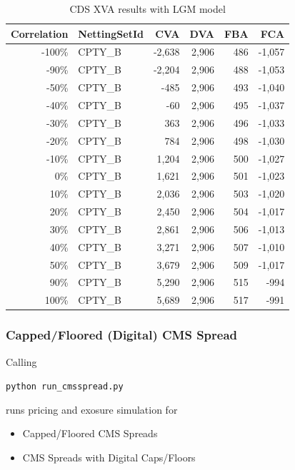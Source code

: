 \begin{table}[hbt]
\scriptsize
\begin{center}
\begin{tabular}{|r|l|r|r|r|r|}
\hline
Correlation & NettingSetId & CVA & DVA & FBA & FCA \\
\hline
-100\%  &  CPTY\_B  &  -2,638  &  2,906  &  486  &  -1,057 \\
 -90\%  &  CPTY\_B  &  -2,204  &  2,906  &  488  &  -1,053 \\
 -50\%  &  CPTY\_B  &    -485  &  2,906  &  493  &  -1,040 \\
 -40\%  &  CPTY\_B  &     -60  &  2,906  &  495  &  -1,037 \\
 -30\%  &  CPTY\_B  &     363  &  2,906  &  496  &  -1,033 \\
 -20\%  &  CPTY\_B  &     784  &  2,906  &  498  &  -1,030 \\
 -10\%  &  CPTY\_B  &   1,204  &  2,906  &  500  &  -1,027 \\
   0\%  &  CPTY\_B  &   1,621  &  2,906  &  501  &  -1,023 \\
  10\%  &  CPTY\_B  &   2,036  &  2,906  &  503  &  -1,020 \\
  20\%  &  CPTY\_B  &   2,450  &  2,906  &  504  &  -1,017 \\
  30\%  &  CPTY\_B  &   2,861  &  2,906  &  506  &  -1,013 \\
  40\%  &  CPTY\_B  &   3,271  &  2,906  &  507  &  -1,010 \\
  50\%  &  CPTY\_B  &   3,679  &  2,906  &  509  &  -1,017 \\
  90\%  &  CPTY\_B  &   5,290  &  2,906  &  515  &    -994 \\
 100\%  &  CPTY\_B  &   5,689  &  2,906  &  517  &    -991 \\
\hline
\end{tabular}
\caption{CDS XVA results with LGM model}
\end{center}
\end{table}

\subsubsection{Capped/Floored (Digital) CMS Spread}\label{example:exposure_cmsspread}

Calling

\medskip
\centerline{\tt python run\_cmsspread.py } 
\medskip

runs pricing and exosure simulation for 
\begin{itemize}
\item Capped/Floored CMS Spreads
\item CMS Spreads with Digital Caps/Floors
\end{itemize}

